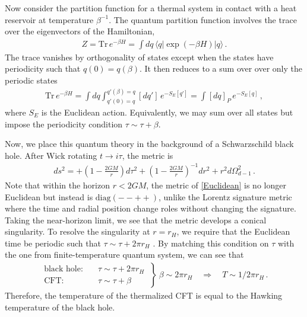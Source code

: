 \documentclass[../PhD.tex]{subfiles}
\begin{document}
Now consider the partition function for a thermal system in contact with a heat reservoir at temperature $\beta^{-1}$. The quantum partition function involves the trace over the eigenvectors of the Hamiltonian,
\begin{align}
\label{quantum par}
Z = \text{Tr} \, e^{- \beta H} = \int dq \, \langle q | \exp ( - \beta H ) | q \rangle \, .
\end{align}
The trace vanishes by orthogonality of states except when the states have periodicity such that $q(0) = q(\beta)$. It then reduces to a sum over over only the periodic states \cite{Schellekens}
\begin{align}
\label{cft trace}
\text{Tr} \, e^{ - \beta H} = \int dq \int^{q'(\beta)=q}_{q'(0)=q} [dq'] \, e^{-S_E[q']} = \int [dq]_P \, e^{-S_E[q]} \, ,
\end{align}
where $S_E$ is the Euclidean action. Equivalently, we may sum over all states but impose the periodicity condition $\tau \sim \tau + \beta$. 

Now, we place this quantum theory in the background of a Schwarzschild black hole. After Wick rotating $t \to i\tau$, the metric is
\begin{align}
\label{Euclidean}
ds^2 = +\left(1 - \frac{2GM}{r} \right) d\tau^2 + \left(1 - \frac{2GM}{r}\right)^{-1}dr^2 + r^2 d\Omega_{d-1}^2 \, .
\end{align}
Note that within the horizon $r < 2GM$, the metric of \eqref{Euclidean} is no longer Euclidean but instead is $\text{diag}(- - + +)$, unlike the Lorentz signature metric where the time and radial position change roles without changing the signature. Taking the near-horizon limit, we see that the metric develops a conical singularity. To resolve the singularity at $r=r_H$, we require that the Euclidean time be periodic such that $\tau \sim \tau + 2\pi r_H$ \cite{hep-th/9803131}. By matching this condition on $\tau$ with the one from finite-temperature quantum system, we can see that 
\begin{align}
\label{temp/grav}
\left. \begin{aligned}
	\text{black hole:} &\quad \tau \sim \tau + 2\pi r_H \\
	\text{CFT:} &\quad \tau \sim \tau + \beta
	\end{aligned}
\: \right\} \: \beta \sim 2\pi r_H \quad \Rightarrow \quad T \sim 1/ 2\pi r_H \, .
\end{align}
Therefore, the temperature of the thermalized CFT is equal to the Hawking temperature of the black hole.
\end{document}

